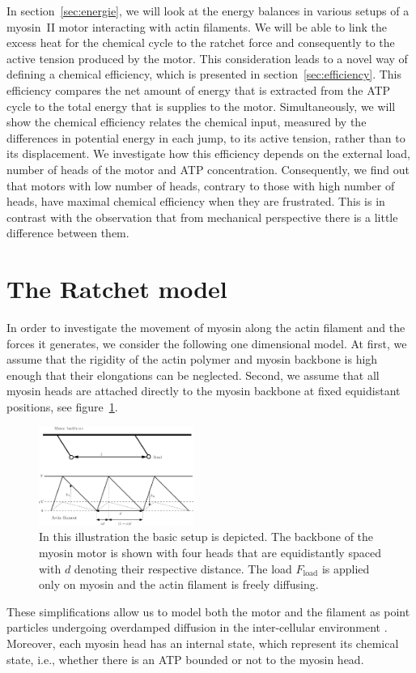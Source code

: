 \documentclass[aps,pre,twocolumn,showpacs,showkeys,superscriptaddress,floatfix]{revtex4-1}
\begin{document}
In section~\ref{sec:energie}, we will look at the energy balances in various setups of a myosin~II motor interacting with actin filaments.
We will be able to link the excess heat for the chemical cycle to the ratchet force and consequently to the active tension produced by the motor.
This consideration leads to a novel way of defining a chemical efficiency, which is presented in section~\ref{sec:efficiency}. 
This efficiency compares the net amount of energy that is extracted from the ATP cycle to the total energy that is supplies to the motor.
Simultaneously, we will show the chemical efficiency relates the chemical input, measured by the differences in potential energy in each jump, 
to its active tension, rather than to its displacement.
We investigate how this efficiency depends on the external load, number of heads of the motor and ATP concentration. 
Consequently, we find out that motors with low number of heads, contrary to those with high number of heads, have maximal chemical efficiency when they are frustrated.
This is in contrast with the observation that from mechanical perspective there is a little difference between them. 


\section{The Ratchet model}
\label{sec:ratchet}
In order to investigate the movement of myosin along the actin filament and the forces it generates, we consider the following one dimensional model.
At first, we assume that the rigidity of the actin polymer and myosin backbone is high enough that their elongations can be neglected.
Second, we assume that all myosin heads are attached directly to the myosin backbone at fixed equidistant positions, see figure~\ref{fig:ratchet_setup}.
\begin{figure}[t]
\centering
\includegraphics[width=0.45\textwidth,height=!]{ratchet_illustration}
\caption{
\label{fig:ratchet_setup}
In this illustration the basic setup is depicted.  
The backbone of the myosin motor is shown with four heads that are equidistantly spaced with $d$ denoting their respective distance. 
The load $F_\text{load}$ is applied only on myosin and the actin filament is freely diffusing. 
} 
\end{figure}
These simplifications allow us to model both the motor and the filament as point particles undergoing overdamped diffusion in the inter-cellular environment \cite{vanKampen1981stochastic}.
Moreover, each myosin head has an internal state, which represent its chemical state, 
i.e., whether there is an ATP bounded or not to the myosin head. 
\end{document}
